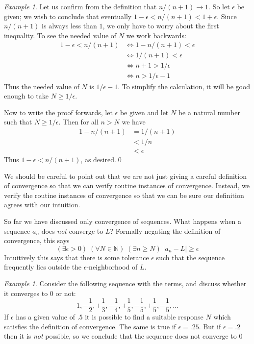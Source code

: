 \documentclass[11pt,oneside]{amsbook}
\newcommand{\NN}{\mathbb N}
\theoremstyle{definition}
\theoremstyle{plain}
\theoremstyle{definition}
\theoremstyle{remark}
\newtheorem{example}[thm]{Example}
\numberwithin{equation}{section}
\numberwithin{figure}{section}
\begin{document}
\begin{example}
  Let us confirm from the definition that $n/(n+1)\to1$. So let $\epsilon$ be given; we wish to conclude that eventually $1-\epsilon<n/(n+1)<1+\epsilon$. Since $n/(n+1)$ is always less than $1$, we only have to worry about the first inequality. To see the needed value of $N$ we work backwards:
  \begin{align*}
    1-\epsilon<n/(n+1)&\iff 1-n/(n+1)<\epsilon \\
                      &\iff 1/(n+1)<\epsilon \\
                      &\iff n+1>1/\epsilon \\
                      &\iff n>1/\epsilon-1
  \end{align*}
  Thus the needed value of $N$ is $1/\epsilon-1$. To simplify the calculation, it will be good enough to take $N\geq 1/\epsilon$.
  
  Now to write the proof forwards, let $\epsilon$ be given and let $N$ be a natural number such that $N\geq 1/\epsilon$. Then for all $n>N$ we have
  \begin{align*}
    1-n/(n+1) &= 1/(n+1)\\
              &< 1/n\\
              &<\epsilon
  \end{align*}
  Thus $1-\epsilon < n/(n+1)$, as desired.\qed
\end{example}

We should be careful to point out that we are not just giving a careful definition of convergence so that we can verify routine instances of convergence. Instead, we verify the routine instances of convergence so that we can be sure our definition agrees with our intuition.


So far we have discussed only convergence of sequences. What happens when a sequence $a_n$ does \emph{not} converge to $L$? Formally negating the definition of convergence, this says
\[(\exists\epsilon>0)\;(\forall N\in\NN)\;(\exists n\geq N)\;|a_n-L|\geq\epsilon
\]
Intuitively this says that there is some tolerance $\epsilon$ such that the sequence frequently lies outside the $\epsilon$-neighborhood of $L$.

\begin{example}
  Consider the following sequence with the terms, and discuss whether it converges to $0$ or not:
  \[1,-\frac12,+\frac13,-\frac14,+\frac15,-\frac15,+\frac15,-\frac15,\ldots
  \]
  If $\epsilon$ has a given value of $.5$ it is possible to find a suitable response $N$ which satisfies the definition of convergence. The same is true if $\epsilon=.25$. But if $\epsilon=.2$ then it is \emph{not} possible, so we conclude that the sequence does not converge to $0$
\end{example}
\end{document}
